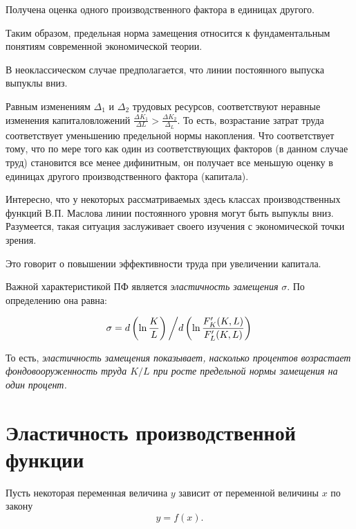 \documentclass[12pt,openbib]{report}
\begin{document}
Получена оценка одного производственного фактора в
единицах другого.

Таким образом, предельная норма замещения относится к
фундаментальным понятиям современной экономической теории.

В неоклассическом случае предполагается, что линии постоянного
выпуска выпуклы вниз.

Равным изменениям $\Delta_1$ и $\Delta_2$
трудовых ресурсов, соответствуют неравные изменения капиталовложений
$\frac{\Delta K_1}{\Delta L}>\frac{\Delta K_2}{\Delta_L}$. То есть,
возрастание затрат труда соответствует уменьшению предельной нормы
накопления. Что соответствует тому, что по мере того как один из
соответствующих факторов (в данном случае труд) становится все менее
дифинитным, он получает все меньшую оценку в единицах другого
производственного фактора (капитала).

Интересно, что у некоторых рассматриваемых здесь классах
производственных функций В.П. Маслова линии постоянного уровня могут
быть выпуклы вниз. Разумеется, такая ситуация заслуживает своего
изучения с экономической точки зрения.

Это говорит о повышении эффективности труда при увеличении капитала.

Важной характеристикой ПФ является {\it эластичность замещения }
$\sigma$. По определению она равна:

\begin{equation}\label{f127}
\sigma=d\left(\ln\frac
KL\right)\left/d\left(\ln\frac{F_K'(K,L)}{F_L'(K,L)}\right)\right.
\end{equation}

То есть, {\it эластичность замещения показывает, насколько процентов
возрастает фондовооруженность труда $K/L$ при росте предельной нормы
замещения на один процент.}

\section{Эластичность производственной функции}

Пусть некоторая переменная величина $y$ зависит от переменной
величины $x$ по закону
\begin{equation}\label{f131}
y=f(x).
\end{equation}
\end{document}
